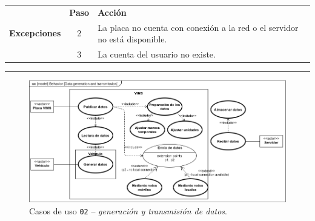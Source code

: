 \begin{table}[H]
\begin{tabularx}{\textwidth}{|c|c|X|}
    \hline
    \multirow{4}{*}{\textbf{Excepciones}}      & \textbf{Paso}                                                                                                          & \textbf{Acción}                                                                                                                    \\
    \cline{2-3}
                                               & 2                                                                                                                      & \multicolumn{1}{L|}{La placa no cuenta con conexión a la red o el servidor no está disponible.}                                    \\
    \cline{2-3}
                                               & 3                                                                                                                      & \multicolumn{1}{L|}{La cuenta del usuario no existe.}                                                                              \\
    \hline
  \end{tabularx}
\end{table}

\noindent\rule{\linewidth}{.2pt}

\begin{figure}[H]
  \centering
  \includegraphics[width=\linewidth]{diagrams/UseCases-UC2 - data.png}
  \caption{Casos de uso \texttt{02} -- \textit{generación y transmisión de datos}.}
  \label{uc:data}
\end{figure}

